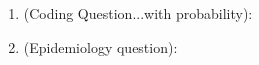 \documentclass[10pt]{amsart}
\theoremstyle{nonumberplain}
\begin{document}
\begin{enumerate}[label={\bf {Question \arabic*}}]
\item (Coding Question...with probability): \\

\item (Epidemiology question): \\

\end{enumerate}
\end{document}
